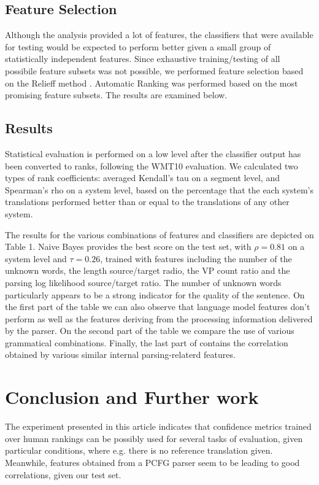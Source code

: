 \documentclass[11pt]{article}
\begin{document}
\subsection{Feature Selection}
Although the analysis provided a lot of features, the classifiers that were
available for testing would be expected to perform better given a small group of
statistically independent features. Since exhaustive training/testing of all
possibile feature subsets was not possible, we performed feature selection
based on the Relieff method
\cite{Kononenko94estimatingattributes:,kira1992feature}. Automatic Ranking was
performed based on the most promising feature subsets. The results are
examined below.

\subsection{Results}
Statistical evaluation is performed on a low level after the classifier output
has been converted to ranks, following the \textsc{WMT10} evaluation. We
calculated two types of rank coefficients: averaged Kendall's tau on a segment
level, and Spearman's rho on a system level, based on the percentage that the
each system's translations performed better than or equal to the translations
of any other system.

The results for the various combinations of features and classifiers are
depicted on Table 1. Naive Bayes provides the best score on the test set, with
$\rho = 0.81$ on a system level and $\tau = 0.26$, trained with features
including the number of the unknown words, the length source/target radio, the
VP count ratio and the parsing log likelihood source/target ratio. The number of
unknown words particularly appears to be a strong indicator for the quality of
the sentence. On the first part of the table we can also observe that language
model features don't perform as well as the features deriving from the
processing information delivered by the parser. On the second part of the table
we compare the use of various grammatical combinations. Finally, the last part
of contains the correlation obtained by various similar internal
parsing-relaterd features.



\section {Conclusion and Further work}
The experiment presented in this article indicates that confidence metrics
trained over human rankings can be possibly used for several tasks of
evaluation, given particular conditions, where e.g. there is no reference
translation given. Meanwhile, features obtained from a PCFG parser seem to be
leading to good correlations, given our test set. 
\end{document}
